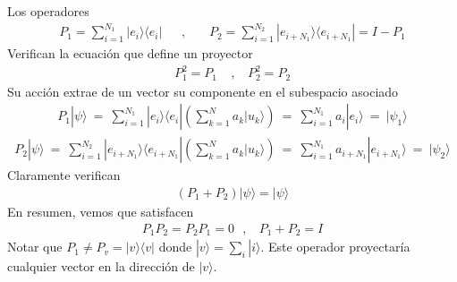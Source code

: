 \documentclass[letterpaper,10pt,english]{jupyterBook}
\newcommand{\bra}[1]{\langle #1|}
\newcommand{\ket}[1]{|#1\rangle}
\newcommand{\ketbra}[2]{| #1\rangle \langle #2 |}
\begin{document}
\sphinxAtStartPar
Los operadores
\begin{equation*}
\begin{split}
P_1 = \sum_{i=1}^{N_1} \ket{e_i}\bra{e_i} ~~~~~~~,~~~~~~~~ P_2 = \sum_{i=1}^{N_2} \ket{e_{i+N_1}}\bra{e_{i+N_1}}
= I - P_1
\end{split}
\end{equation*}
\sphinxAtStartPar
Verifican la ecuación que define un proyector
\begin{equation*}
\begin{split}
P_1^2 = P_1~~~~~,~~~~P_2^2 = P_2
\end{split}
\end{equation*}
\sphinxAtStartPar
Su acción extrae de un vector su componente en el subespacio asociado
\begin{equation*}
\begin{split}
P_1 \ket{\psi} ~=~ \sum_{i=1}^{N_1} \ket{e_i}\bra{e_i} \left(\sum_{k=1}^N a_k \ket{u_k} \right) ~=~
\sum_{i=1}^{N_1} a_i \ket{e_i} ~=~ \ket{\psi_1}
\end{split}
\end{equation*}\begin{equation*}
\begin{split}
P_2 \ket{\psi} ~=~ \sum_{i=1}^{N_2} \ket{e_{i+N_1}}\bra{e_{i+N_1}} \left(\sum_{k=1}^N a_k \ket{u_k} \right) ~=~
\sum_{i=1}^{N_1} a_{i+N_1} \ket{e_{i+N_1}} ~=~ \ket{\psi_2}
\end{split}
\end{equation*}
\sphinxAtStartPar
Claramente verifican
\begin{equation*}
\begin{split}
(P_1 + P_2)\ket{\psi} = \ket{\psi}
\end{split}
\end{equation*}
\sphinxAtStartPar
En resumen, vemos que satisfacen
\begin{equation*}
\begin{split}
P_1 P_2 = P_2 P_1  = 0 ~~~,~~~~P_1 + P_2 = I
\end{split}
\end{equation*}
\sphinxAtStartPar
Notar que \(P_1 \neq P_v = \ketbra{v}{v}\) donde \(\ket{v} = \sum_i \ket{i}\). Este operador proyectaría cualquier vector en la dirección de \(\ket{v}\).
\end{document}
